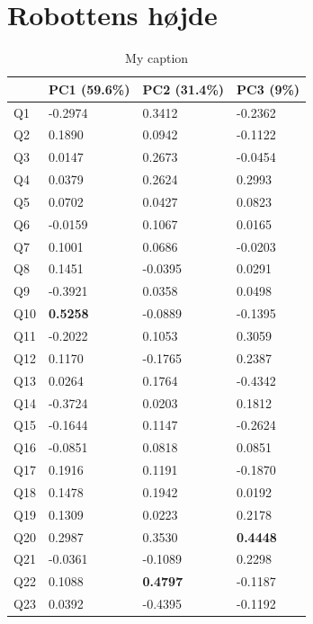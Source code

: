 \section{Robottens højde}
\label{DatabehandlingRHeight}
%

\begin{table}[]
\centering
\begin{tabular}{l|l|l|l}
    & PC1 (59.6\%)    & PC2 (31.4\%)    & PC3 (9\%)       \\ \hline
Q1  & -0.2974         & 0.3412          & -0.2362         \\ \hline
Q2  & 0.1890          & 0.0942          & -0.1122         \\ \hline
Q3  & 0.0147          & 0.2673          & -0.0454         \\ \hline
Q4  & 0.0379          & 0.2624          & 0.2993          \\ \hline
Q5  & 0.0702          & 0.0427          & 0.0823          \\ \hline
Q6  & -0.0159         & 0.1067          & 0.0165          \\ \hline
Q7  & 0.1001          & 0.0686          & -0.0203         \\ \hline
Q8  & 0.1451          & -0.0395         & 0.0291          \\ \hline
Q9  & -0.3921         & 0.0358          & 0.0498          \\ \hline
Q10 & \textbf{0.5258} & -0.0889         & -0.1395         \\ \hline
Q11 & -0.2022         & 0.1053          & 0.3059          \\ \hline
Q12 & 0.1170          & -0.1765         & 0.2387          \\ \hline
Q13 & 0.0264          & 0.1764          & -0.4342         \\ \hline
Q14 & -0.3724         & 0.0203          & 0.1812          \\ \hline
Q15 & -0.1644         & 0.1147          & -0.2624         \\ \hline
Q16 & -0.0851         & 0.0818          & 0.0851          \\ \hline
Q17 & 0.1916          & 0.1191          & -0.1870         \\ \hline
Q18 & 0.1478          & 0.1942          & 0.0192          \\ \hline
Q19 & 0.1309          & 0.0223          & 0.2178          \\ \hline
Q20 & 0.2987          & 0.3530          & \textbf{0.4448} \\ \hline
Q21 & -0.0361         & -0.1089         & 0.2298          \\ \hline
Q22 & 0.1088          & \textbf{0.4797} & -0.1187         \\ \hline
Q23 & 0.0392          & -0.4395         & -0.1192        
\end{tabular}
\caption{My caption}
\label{my-label}
\end{table}

